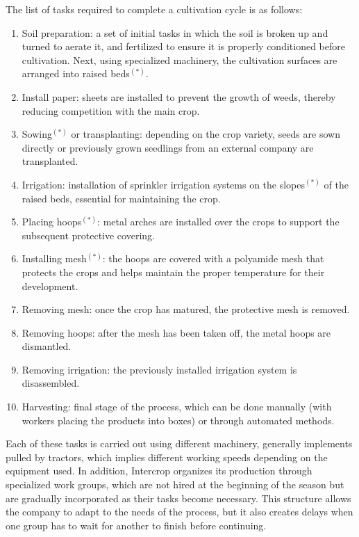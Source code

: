 The list of tasks required to complete a cultivation cycle is as follows:
\begin{enumerate}
    \item Soil preparation: a set of initial tasks in which the soil is broken up and turned to aerate it, and fertilized to ensure it is properly conditioned before cultivation.  
Next, using specialized machinery, the cultivation surfaces are arranged into \gls{raised bed}s$^{(*)}$.

\item Install paper: sheets are installed to prevent the growth of weeds, thereby reducing competition with the main crop.

\item \gls{Sowing}$^{(*)}$ or transplanting: depending on the crop variety, seeds are sown directly or previously grown seedlings from an external company are transplanted.

\item Irrigation: installation of sprinkler irrigation systems on the \gls{slope}s$^{(*)}$ of the raised beds, essential for maintaining the crop.

\item Placing \gls{hoops}$^{(*)}$: metal arches are installed over the crops to support the subsequent protective covering.

\item Installing \gls{mesh}$^{(*)}$: the hoops are covered with a polyamide mesh that protects the crops and helps maintain the proper temperature for their development.

\item Removing mesh: once the crop has matured, the protective mesh is removed.

\item Removing hoops: after the mesh has been taken off, the metal hoops are dismantled.

\item Removing irrigation: the previously installed irrigation system is disassembled.

\item Harvesting: final stage of the process, which can be done manually (with workers placing the products into boxes) or through automated methods.

\end{enumerate}

Each of these tasks is carried out using different machinery, generally implements pulled by tractors, which implies different working speeds depending on the equipment used.  
In addition, Intercrop organizes its production through specialized work groups, which are not hired at the beginning of the season but are gradually incorporated as their tasks become necessary.  
This structure allows the company to adapt to the needs of the process, but it also creates delays when one group has to wait for another to finish before continuing.

